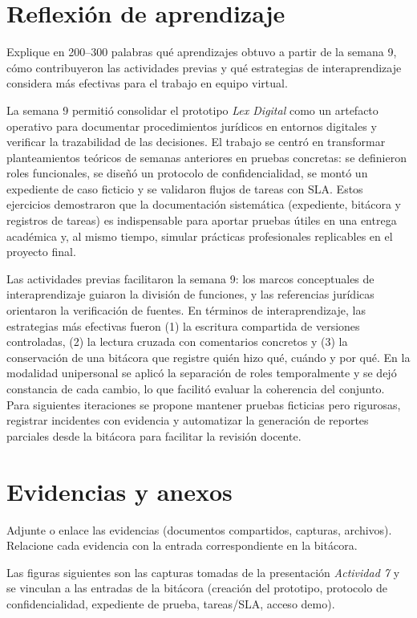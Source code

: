 \documentclass[
  spanish,
  letterpaper, oneside
]{article}
\begin{document}
\section{Reflexión de aprendizaje}

Explique en 200–300 palabras qué aprendizajes obtuvo a partir de la semana 9, cómo contribuyeron las actividades previas y qué estrategias de interaprendizaje considera más efectivas para el trabajo en equipo virtual.

La semana 9 permitió consolidar el prototipo \textit{Lex Digital} como un artefacto operativo para documentar
procedimientos jurídicos en entornos digitales y verificar la trazabilidad de las decisiones. El trabajo se centró
en transformar planteamientos teóricos de semanas anteriores en pruebas concretas: se definieron roles funcionales,
se diseñó un protocolo de confidencialidad, se montó un expediente de caso ficticio y se validaron flujos de tareas
con SLA. Estos ejercicios demostraron que la documentación sistemática (expediente, bitácora y registros de tareas)
es indispensable para aportar pruebas útiles en una entrega académica y, al mismo tiempo, simular prácticas
profesionales replicables en el proyecto final.

Las actividades previas facilitaron la semana 9: los marcos conceptuales de interaprendizaje guiaron la división
de funciones, y las referencias jurídicas orientaron la verificación de fuentes. En términos de interaprendizaje,
las estrategias más efectivas fueron (1) la escritura compartida de versiones controladas, (2) la lectura cruzada
con comentarios concretos y (3) la conservación de una bitácora que registre quién hizo qué, cuándo y por qué.
En la modalidad unipersonal se aplicó la separación de roles temporalmente y se dejó constancia de cada cambio, lo
que facilitó evaluar la coherencia del conjunto. Para siguientes iteraciones se propone mantener pruebas ficticias
pero rigurosas, registrar incidentes con evidencia y automatizar la generación de reportes parciales desde la
bitácora para facilitar la revisión docente.

\section{Evidencias y anexos}

Adjunte o enlace las evidencias (documentos compartidos, capturas, archivos). Relacione cada evidencia con la entrada correspondiente en la bitácora.

Las figuras siguientes son las capturas tomadas de la presentación \textit{Actividad 7} y se vinculan a las entradas
de la bitácora (creación del prototipo, protocolo de confidencialidad, expediente de prueba, tareas/SLA, acceso demo).
\end{document}
